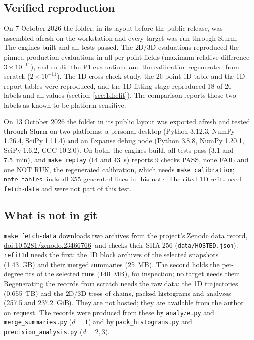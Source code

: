 \documentclass[10pt,a4paper]{article}
\newcommand{\code}[1]{\texttt{#1}}
\begin{document}
\subsection{Verified reproduction}
On 7 October 2026 the folder, in its layout before the public release, was assembled afresh on the workstation and every target was run
through Slurm. The engines built and all tests passed. The 2D/3D evaluations reproduced the pinned production evaluations in all per-point
fields (maximum relative difference $3\times10^{-11}$), and so did the P1 evaluations and the calibration regenerated from scratch
($2\times10^{-11}$). The 1D cross-check study, the 20-point 1D table and the 1D report tables were reproduced, and the 1D fitting stage
reproduced 18 of 20 labels and all values (section~\ref{sec:1drefit}). The comparison reports those two labels as known to be platform-sensitive.

On 13 October 2026 the folder in its public layout was exported afresh and tested through Slurm on two platforms: a personal desktop (Python 3.12.3,
NumPy 1.26.4, SciPy 1.11.4) and an Expanse debug node (Python 3.8.8, NumPy 1.20.1, SciPy 1.6.2, GCC 10.2.0). On both, the engines build, all tests
pass (3.1 and 7.5~min), and \code{make replay} (14 and 43~s) reports 9 checks PASS, none FAIL and one NOT RUN, the regenerated calibration, which
needs \code{make calibration}; \code{note-tables} finds all 355 generated lines in this note. The cited 1D refits need \code{fetch-data} and
were not part of this test.

\subsection{What is not in git}
\code{make fetch-data} downloads two archives from the project's Zenodo data record, \href{https://doi.org/10.5281/zenodo.23466766}{doi:10.5281/zenodo.23466766}, and checks their SHA-256 (\code{data/HOSTED.json}).
\code{refit1d} needs the first: the 1D block archives of the selected snapshots (1.43~GB) and their merged summaries (25~MB). The second
holds the per-degree fits of the selected runs (140~MB), for inspection; no target needs them. Regenerating the records from scratch needs
the raw data: the 1D trajectories (0.655~TB) and the 2D/3D trees of chains, packed histograms and analyses (257.5 and 237.2~GiB). They are
not hosted; they are available from the author on request. The records were produced from
these by \code{analyze.py} and \code{merge\_summaries.py} ($d=1$) and by \code{pack\_histograms.py} and \code{precision\_analysis.py} ($d=2,3$).
\end{document}
